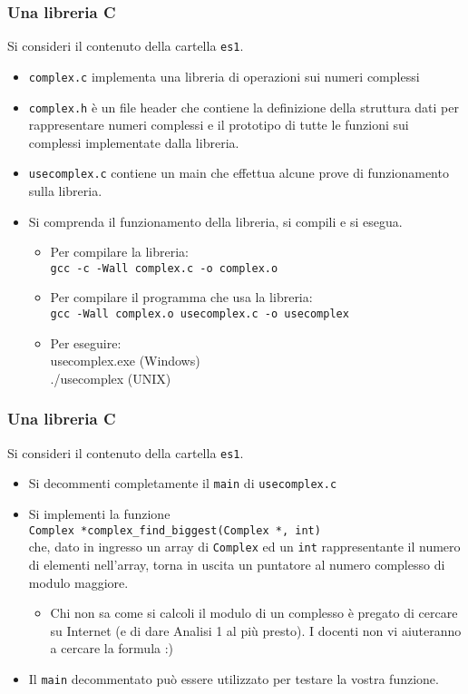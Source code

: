\documentclass{beamer}
\begin{document}
\begin{frame}[fragile]
\frametitle{Una libreria C}
Si consideri il contenuto della cartella \texttt{es1}.
\begin{itemize}
 \item \texttt{complex.c} implementa una libreria di operazioni sui numeri complessi
 \item \texttt{complex.h} è un file header che contiene la definizione della struttura dati per rappresentare numeri complessi e il prototipo di tutte le funzioni sui complessi implementate dalla libreria.
 \item \texttt{usecomplex.c} contiene un main che effettua alcune prove di funzionamento sulla libreria.
 \item Si comprenda il funzionamento della libreria, si compili e si esegua.
 \begin{itemize}
  \item Per compilare la libreria: \\ \texttt{gcc -c -Wall complex.c -o complex.o}
  \item Per compilare il programma che usa la libreria:\\ \texttt{gcc -Wall complex.o usecomplex.c -o usecomplex}
  \item Per eseguire: \\ usecomplex.exe (Windows) \\ ./usecomplex (UNIX)
 \end{itemize}

\end{itemize}
\end{frame}

\begin{frame}[fragile]
\frametitle{Una libreria C}
Si consideri il contenuto della cartella \texttt{es1}.
\begin{itemize}
  \item Si decommenti completamente il \texttt{main} di \texttt{usecomplex.c}
  \item Si implementi la funzione\\ \texttt{Complex *complex\_find\_biggest(Complex *, int)}\\ che, dato in ingresso un array di \texttt{Complex} ed un \texttt{int} rappresentante il numero di elementi nell'array, torna in uscita un puntatore al numero complesso di modulo maggiore.
  \begin{itemize}
    \item Chi non sa come si calcoli il modulo di un complesso è pregato di cercare su Internet (e di dare Analisi 1 al più presto). I docenti non vi aiuteranno a cercare la formula :)
  \end{itemize}
  \item Il \texttt{main} decommentato può essere utilizzato per testare la vostra funzione.
\end{itemize}
\end{frame}
\end{document}
